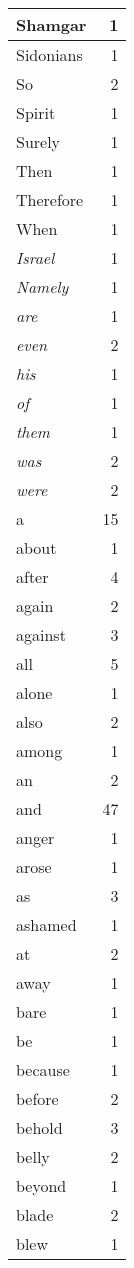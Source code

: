 \begin{center}
\begin{longtable}{l|r}
Shamgar & 1 \\ \hline
Sidonians & 1 \\ \hline
So & 2 \\ \hline
Spirit & 1 \\ \hline
Surely & 1 \\ \hline
Then & 1 \\ \hline
Therefore & 1 \\ \hline
When & 1 \\ \hline
\emph{Israel} & 1 \\ \hline
\emph{Namely} & 1 \\ \hline
\emph{are} & 1 \\ \hline
\emph{even} & 2 \\ \hline
\emph{his} & 1 \\ \hline
\emph{of} & 1 \\ \hline
\emph{them} & 1 \\ \hline
\emph{was} & 2 \\ \hline
\emph{were} & 2 \\ \hline
a & 15 \\ \hline
about & 1 \\ \hline
after & 4 \\ \hline
again & 2 \\ \hline
against & 3 \\ \hline
all & 5 \\ \hline
alone & 1 \\ \hline
also & 2 \\ \hline
among & 1 \\ \hline
an & 2 \\ \hline
and & 47 \\ \hline
anger & 1 \\ \hline
arose & 1 \\ \hline
as & 3 \\ \hline
ashamed & 1 \\ \hline
at & 2 \\ \hline
away & 1 \\ \hline
bare & 1 \\ \hline
be & 1 \\ \hline
because & 1 \\ \hline
before & 2 \\ \hline
behold & 3 \\ \hline
belly & 2 \\ \hline
beyond & 1 \\ \hline
blade & 2 \\ \hline
blew & 1 \\ \hline

\end{longtable}
\end{center}
